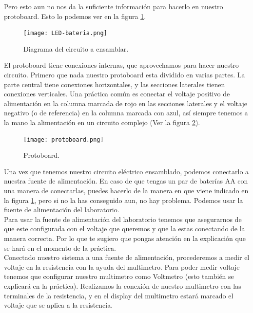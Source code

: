 \documentclass[paper=letter, fontsize=11pt]{scrartcl} %
\numberwithin{equation}{section} %
\numberwithin{figure}{section} %
\numberwithin{table}{section} %
\begin{document}
    Pero esto aun no nos da la suficiente información para hacerlo en nuestro protoboard. Esto lo podemos ver en la figura \ref{dia:cir}. \\

    \begin{figure}[h]
    	\begin{center}
    		\texttt{[image: LED-bateria.png]} %
    		\caption{Diagrama del circuito a ensamblar.}
    		\label{dia:cir}
    	\end{center}
    \end{figure}

    El protoboard tiene conexiones internas, que aprovechamos para hacer nuestro circuito. Primero que nada nuestro protoboard esta dividido en varias partes. La parte central tiene conexiones horizontales, y las secciones laterales tienen conexiones verticales. Una práctica común es conectar el voltaje positivo de alimentación en la columna marcada de rojo en las secciones laterales y el voltaje negativo (o de referencia) en la columna marcada con azul, así siempre tenemos a la mano la alimentación en un circuito complejo (Ver la figura \ref{dia:proto}). \\

    \begin{figure}[h]
    	\begin{center}
    		\texttt{[image: protoboard.png]} %
    		\caption{Protoboard.}
    		\label{dia:proto}
    	\end{center}
    \end{figure}

    Una vez que tenemos nuestro circuito eléctrico ensamblado, podemos conectarlo a nuestra fuente de alimentación. En caso de que tengas un par de baterías AA con una manera de conectarlas, puedes hacerlo de la manera en que viene indicado en la figura \ref{dia:cir}, pero si no la has conseguido aun, no hay problema. Podemos usar la fuente de alimentación del laboratorio. \\

    Para usar la fuente de alimentación del laboratorio tenemos que asegurarnos de que este configurada con el voltaje que queremos y que la estas conectando de la manera correcta. Por lo que te sugiero que pongas atención en la explicación que se hará en el momento de la práctica. \\

    Conectado nuestro sistema a una fuente de alimentación, procederemos a medir el voltaje en la resistencia con la ayuda del multimetro. Para poder medir voltaje tenemos que configurar nuestro multimetro como Voltmetro (esto también se explicará en la práctica). Realizamos la conexión de nuestro multimetro con las terminales de la resistencia, y en el display del multimetro estará marcado el voltaje que se aplica a la resistencia. \\
\end{document}
